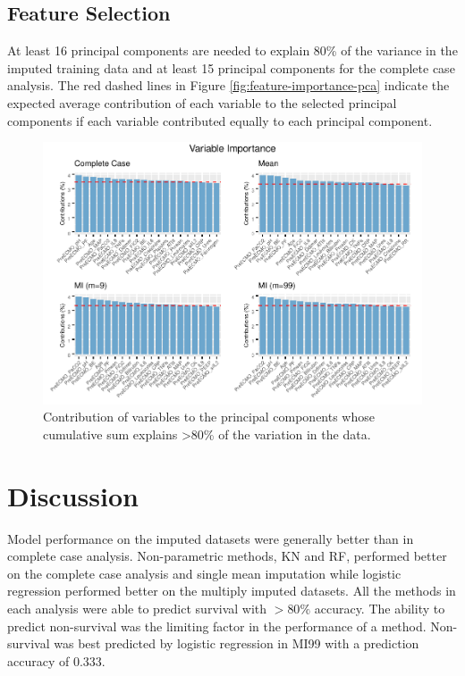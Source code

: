 \documentclass[12pt,]{article}
\begin{document}
\subsection{Feature Selection}\label{feature-selection-1}

At least 16 principal components are needed to explain 80\% of the
variance in the imputed training data and at least 15 principal
components for the complete case analysis. The red dashed lines in
Figure \ref{fig:feature-importance-pca} indicate the expected average
contribution of each variable to the selected principal components if
each variable contributed equally to each principal component.

\begin{figure}[H]

{\centering \includegraphics[width=1\linewidth]{figure/graphics-unnamed-chunk-10-1} 

}

\caption{\label{fig:feature-importance-pca}Contribution of variables to the principal components whose cumulative sum explains >80\% of the variation in the data.}\label{fig:unnamed-chunk-10}
\end{figure}

\newpage

\section{Discussion}\label{discussion}

Model performance on the imputed datasets were generally better than in
complete case analysis. Non-parametric methods, KN and RF, performed
better on the complete case analysis and single mean imputation while
logistic regression performed better on the multiply imputed datasets.
All the methods in each analysis were able to predict survival with
\(>80\%\) accuracy. The ability to predict non-survival was the limiting
factor in the performance of a method. Non-survival was best predicted
by logistic regression in MI99 with a prediction accuracy of \(0.333\).
\end{document}
